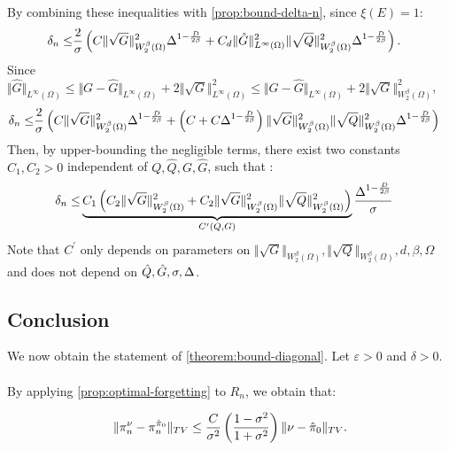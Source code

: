 By combining these inequalities with \cref{prop:bound-delta-n}, since $\xi(E) = 1$:
\begin{align}
    \delta_n \leq & \frac{2}{\sigma}\left(C\Vert \sqrt{G}\Vert^2_{W^\beta_2(\Omega)}\Delta^{1- \frac{D}{2\beta}} + C_d \Vert\hat G\Vert_{L^\infty(\Omega)}^2\Vert \sqrt{Q}\Vert^2_{W^\beta_2(\Omega)}\Delta^{1 - \frac{D}{2\beta}}\right).
\end{align}
Since $\Vert \hat G\Vert_{L^\infty(\Omega)} \leq \Vert G - \hat G \Vert_{L^\infty(\Omega)} + 2 \Vert \sqrt{G}\Vert_{L^\infty(\Omega)}^2 \leq \Vert G - \hat G \Vert_{L^\infty(\Omega)} + 2 \Vert \sqrt{G}\Vert^2_{W^\beta_2(\Omega)}$,
\begin{align*}
    \delta_n \leq & \frac{2}{\sigma}\left(C\Vert \sqrt{G}\Vert^2_{W^\beta_2(\Omega)}\Delta^{1- \frac{D}{2\beta}} + \left(C + C\Delta^{1- \frac{D}{2\beta}}\right)\Vert\sqrt{G}\Vert^2_{W^\beta_2(\Omega)}\Vert\sqrt{Q}\Vert^2_{W^\beta_2(\Omega)}\Delta^{1 - \frac{D}{2\beta}}\right)
\end{align*}
Then, by upper-bounding the negligible terms, there exist two constants $C_1, C_2>0$ independent of $Q, \hat Q, G, \hat G$, such that :
\begin{align}
    \delta_n \leq & \underbrace{C_1\left(C_2 \Vert\sqrt{G}\Vert^2_{W^\beta_2(\Omega)} + C_2\Vert \sqrt{G}\Vert^2_{W^\beta_2(\Omega)}\Vert \sqrt{Q}\Vert^2_{W^\beta_2(\Omega)} \right)}_{C^\prime(Q, G)} \frac{\Delta^{1-\frac{D}{2\beta}}}{\sigma}
\end{align}
Note that $C^\prime$ only depends on parameters on $\Vert \sqrt{G}\Vert_{W^\beta_2(\Omega)}, \Vert \sqrt{Q}\Vert_{W^\beta_2(\Omega)}, d, \beta, \Omega$ and does not depend on $\hat{Q}, \hat{G}, \sigma, \Delta$.

\subsection{Conclusion}\label{sec:bound-proof-conclusion}
We now obtain the statement of \cref{theorem:bound-diagonal}. Let $\varepsilon > 0$ and $\delta>0$.

\paragraph{}
By applying \cref{prop:optimal-forgetting} to $R_n$, we obtain that:

\begin{equation}\label{eq:forgetting}
\Vert \pi_n^\nu - \pi^{\hat\pi_0}_n \Vert_{TV} \leq \frac{C}{\sigma^2}\left(\frac{1 - \sigma^2}{1 + \sigma^2}\right)\Vert \nu - \hat \pi_0\Vert_{TV}.
\end{equation}

